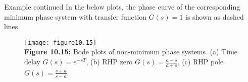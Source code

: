 \documentclass{beamer-control}
\begin{document}
\begin{frame}{Example continued}
In the below plots, the phase curve of the corresponding minimum phase system with transfer function $G(s)=1$ is shown as dashed lines
\begin{figure}
	\centering
	\texttt{[image: figure10.15]}
	\\
	\textbf{Figure 10.15:} Bode plots of non-minimum phase systems. (a) Time delay $G(s)=e^{-sT}$, (b) RHP zero $G(s)=\frac{a-s}{a+s}$, (c) RHP pole $G(s)=\frac{s+a}{s-a}$. 
\end{figure}
\end{frame}

\SUMMARYFRAME
\FINALE
\end{document}
